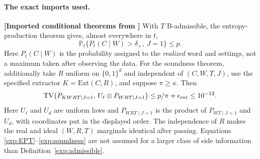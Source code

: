 \documentclass[11pt,a4paper]{article}
\theoremstyle{definition}
\theoremstyle{remark}\newtheorem{remark}[theorem]{Remark}
\newcommand{\status}[1]{\textbf{[#1]}\quad}
\newcommand{\TV}{\mathrm{TV}}
\newcommand{\Prb}{\mathbb P}
\begin{document}
\paragraph{The exact imports used.}
\status{Imported conditional theorems from \cite[Eq.~(4), Eqs.~(5)--(6), SI~S.2 and S.5]{Bierhorst18}}
With $T$ B-admissible, the entropy-production theorem gives, almost everywhere in $t$,
\begin{equation}\label{exp:EPT}
 \Prb_t\{P_t(C\mid W)>\delta_+,\ J=1\}\le p.
\end{equation}
Here $P_t(C\mid W)$ is the probability assigned to the \emph{realized} word and settings, not a maximum taken after observing the data. For the soundness theorem, additionally take $R$ uniform on $\{0,1\}^d$ and independent of $(C,W,T,J)$, use the specified extractor $K=\mathrm{Ext}(C,R)$, and suppose $\pi\ge\kappa$. Then
\begin{equation}\label{exp:soundness}
 \TV\!\left(P_{KWRT\mid J=1},\,
 U_\ell\otimes P_{WRT\mid J=1}\right)
 \le p/\pi+\epsilon_{\rm ext}\le10^{-12}.
\end{equation}
Here $U_\ell$ and $U_d$ are uniform laws and $P_{WRT\mid J=1}$ is the product of $P_{WT\mid J=1}$ and $U_d$, with coordinates put in the displayed order. The independence of $R$ makes the real and ideal $(W,R,T)$ marginals identical after passing. Equations \eqref{exp:EPT}--\eqref{exp:soundness} are not assumed for a larger class of side information than Definition~\ref{exp:admissible}.
\end{document}
